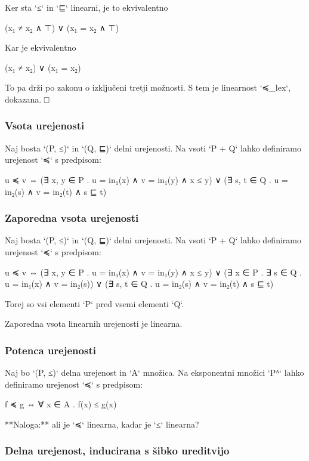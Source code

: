 Ker sta `≤` in `⊑` linearni, je to ekvivalentno

    (x₁ ≠ x₂ ∧ ⊤) ∨ (x₁ = x₂ ∧ ⊤)

Kar je ekvivalentno

    (x₁ ≠ x₂) ∨ (x₁ = x₂)

To pa drži po zakonu o izključeni tretji možnosti. S tem je linearnost `≼_lex`, dokazana. □


\subsubsection{Vsota urejenosti}

Naj bosta `(P, ≤)` in `(Q, ⊑)` delni urejenosti. Na vsoti `P + Q` lahko
definiramo urejenost `≼` s predpisom:

    u ≼ v ⇔ (∃ x, y ∈ P . u = in₁(x) ∧ v = in₁(y) ∧ x ≤ y) ∨
            (∃ s, t ∈ Q . u = in₂(s) ∧ v = in₂(t) ∧ s ⊑ t)

\subsubsection{Zaporedna vsota urejenosti}

Naj bosta `(P, ≤)` in `(Q, ⊑)` delni urejenosti. Na vsoti `P + Q` lahko definiramo urejenost `≼` s predpisom:

    u ≼ v ⇔ (∃ x, y ∈ P . u = in₁(x) ∧ v = in₁(y) ∧ x ≤ y) ∨
            (∃ x ∈ P . ∃ s ∈ Q . u = in₁(x) ∧ v = in₂(s)) ∨
            (∃ s, t ∈ Q . u = in₂(s) ∧ v = in₂(t) ∧ s ⊑ t)

Torej so vsi elementi `P` pred vsemi elementi `Q`.

Zaporedna vsota linearnih urejenosti je linearna.


\subsubsection{Potenca urejenosti}

Naj bo `(P, ≤)` delna urejenost in `A` množica. Na eksponentni množici `Pᴬ` lahko definiramo urejenost `≼` s predpisom:

    f ≼ g ⇔ ∀ x ∈ A . f(x) ≤ g(x)

**Naloga:** ali je `≼` linearna, kadar je `≤` linearna?


\subsubsection{Delna urejenost, inducirana s šibko ureditvijo}

